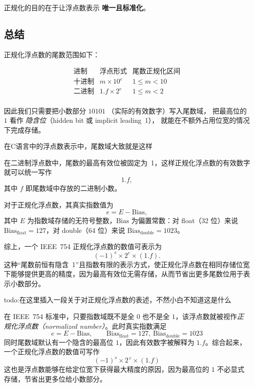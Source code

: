 正规化的目的在于让浮点数表示 \textbf{唯一且标准化}。

\subsection{总结}

正规化浮点数的尾数范围如下：

\[
\begin{array}{c|c|c}
\text{进制} & \text{浮点形式} & \text{尾数正规化区间} \\
\hline
\text{十进制} & m \times 10^e & 1 \le m < 10 \\
\text{二进制} & 1.f \times 2^e & 1 \le m < 2 \\
\end{array}
\]









因此我们只需要把小数部分 $10101$ （实际的有效数字）写入尾数域，
把最高位的 $1$ 看作 \emph{隐含位}（hidden bit 或 implicit leading~1），
就能在不额外占用位宽的情况下完成存储。

在C语言中的浮点数表示中，尾数域大致就是这样


在二进制浮点数中，尾数的最高有效位被固定为~1，这样正规化浮点数的有效数字就可以统一写作
\[
1.f ,
\]
其中 $f$ 即尾数域中存放的二进制小数。

对于正规化浮点数，其真实指数值为
\[
e = E - \mathrm{Bias},
\]
其中 $E$ 为指数域存储的无符号整数，$\mathrm{Bias}$ 为偏置常数：对 float（32 位）来说 $\mathrm{Bias}_{\text{float}} = 127$，对 double（64 位）来说 $\mathrm{Bias}_{\text{double}} = 1023$。

综上，一个 IEEE~754 正规化浮点数的数值可表示为
\[
(-1)^s \times 2^e \times (1.f).
\]
这种“尾数前恒有隐含~1”且指数有限的表示方式，使正规化浮点数在相同存储位宽下能够提供更高的精度，因为最高有效位无需存储，从而节省出更多尾数位用于表示小数部分。








todo:在这里插入一段关于对正规化浮点数的表述，不然小白不知道这是什么

在 IEEE~754 标准中，只要指数域既不是全 $0$ 也不是全 $1$，该浮点数就被视作\emph{正规化浮点数（normalized number）}。此时真实指数满足
\[
e = E - \text{Bias}, \qquad \text{Bias}_{\text{float}} = 127,\ \text{Bias}_{\text{double}} = 1023
\]同时尾数域默认有一个隐含的最高位 $1$，因此有效数字被解释为 $1.f$。综合起来，一个正规化浮点数的数值可写作
\[
(-1)^s \times 2^{\,e} \times (1.f)
\]
这也是浮点数能够在给定位宽下获得最大精度的原因，因为最高位的 $1$ 不必显式存储，节省出更多位给小数部分。







